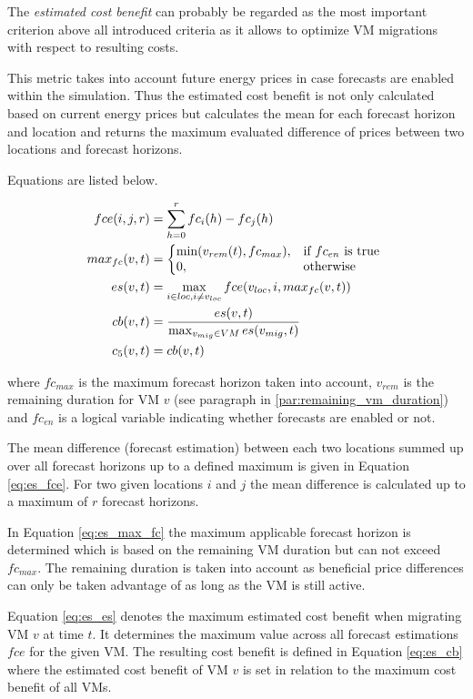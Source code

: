 The \textit{estimated cost benefit} can probably be regarded as the most important criterion above all introduced criteria as it allows to optimize VM migrations with respect to resulting costs. 

This metric takes into account future energy prices in case forecasts are enabled within the simulation. Thus the estimated cost benefit is not only calculated based on current energy prices but calculates the mean for each forecast horizon and location and returns the maximum evaluated difference of prices between two locations and forecast horizons. 

Equations are listed below. 

\begin{align}
	fce(i,j,r) &= \sum_{h=0}^r fc_i(h) - fc_j(h) \label{eq:es_fce}\\
	max_{fc}(v,t) &= \left\{
								\begin{array}{@{}ll@{}}
									\min (v_{rem}(t),fc_{max}), & \text{if } fc_{en} \text{ is true } \\
									0, & \text{otherwise}
								\end{array}\right. \label{eq:es_max_fc}\\
	es(v,t) &= \max_{i \in loc, i \neq v_{loc}} fce(v_{loc},i,max_{fc}(v,t)) \label{eq:es_es} \\
	cb(v,t) &= \frac{es(v,t)}{\max_{v_{mig} \in VM}  es(v_{mig},t)} \label{eq:es_cb} \\
	c_5(v,t) &= cb(v,t) \label{eq:es_c_5}
\end{align}

where $fc_{max}$ is the maximum forecast horizon taken into account, $v_{rem}$ is the remaining duration for VM $v$ (see paragraph in \ref{par:remaining_vm_duration}) and $fc_{en}$ is a logical variable indicating whether forecasts are enabled or not. 

The mean difference (forecast estimation) between each two locations summed up over all forecast horizons up to a defined maximum is given in Equation \ref{eq:es_fce}. For two given locations $i$ and $j$ the mean difference is calculated up to a maximum of $r$ forecast horizons. 

In Equation \ref{eq:es_max_fc} the maximum applicable forecast horizon is determined which is based on the remaining VM duration but can not exceed $fc_{max}$. The remaining duration is taken into account as beneficial price differences can only be taken advantage of as long as the VM is still active. 

Equation \ref{eq:es_es} denotes the maximum estimated cost benefit when migrating VM $v$ at time $t$. It determines the maximum value across all forecast estimations $fce$ for the given VM. 
The resulting cost benefit is defined in Equation \ref{eq:es_cb} where the estimated cost benefit of VM $v$ is set in relation to the maximum cost benefit of all VMs. 

